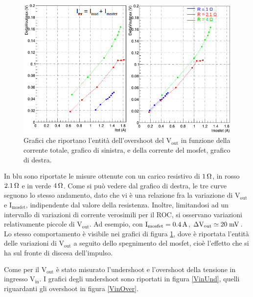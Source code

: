 \begin{figure}
\centering
\includegraphics[width=0.9\linewidth]{Immagini/VoutOver}
\caption{Grafici che riportano l'entità dell'overshoot del $\mathrm{V_{out}}$ in funzione della corrente totale, grafico di sinistra, e della corrente del mosfet, grafico di destra.}
\label{VoutOver}
\end{figure}
In blu sono riportate le misure ottenute con un carico resistivo di $1 {\rm \, \Omega}$, in rosso $2.1 {\rm \, \Omega}$  e in verde $4 {\rm \, \Omega}$.
Come si può vedere dal grafico di destra, le tre curve seguono lo stesso andamento, dato che vi è una relazione fra la variazione di $\mathrm{V_{out}}$ e $\mathrm{I_{mosfet}}$, indipendente dal valore della resistenza.
Inoltre, limitandosi ad un intervallo di variazioni di corrente verosimili per il ROC, si osservano variazioni relativamente piccole di $\mathrm{V_{out}}$.
Ad esempio, con $\mathrm{I_{mosfet}= 0.4 \rm \, A}$, $\mathrm{\Delta V_{out} \simeq 20\rm \; mV}$.
Lo stesso comportamento è visibile nei grafici di figura \ref{VoutOver}, dove è riportata l'entità delle variazioni di $\mathrm{V_{out}}$ a seguito dello spegnimento del mosfet, cioè l'effetto che si ha sul fronte di discesa dell'impulso. 

Come per il $\mathrm{V_{out}}$ è stato misurato l'undershoot e l'overshoot della tensione in ingresso $\mathrm{V_{in}}$. I grafici degli undershoot sono riportati in figura \ref{VinUnd}, quelli riguardanti gli overshoot in figura \ref{VinOver}. 

